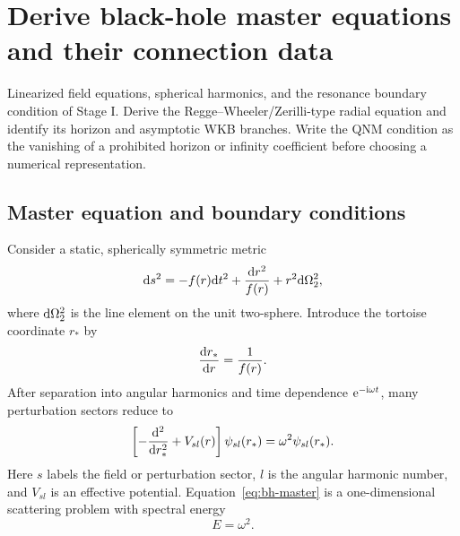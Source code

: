 \section{Derive black-hole master equations and their connection data}
\label{sec:black-hole-qnm}

\calculationroute
  {Linearized field equations, spherical harmonics, and the resonance boundary
  condition of Stage I.}
  {Derive the Regge--Wheeler/Zerilli-type radial equation and identify its
  horizon and asymptotic WKB branches.}
  {Write the QNM condition as the vanishing of a prohibited horizon or
  infinity coefficient before choosing a numerical representation.}

\subsection{Master equation and boundary conditions}
\label{subsec:bh-master}

Consider a static, spherically symmetric metric
\begin{equation}
  \mathrm{d} s^2
  =-f(r)\mathrm{d} t^2+\frac{\mathrm{d} r^2}{f(r)}
  +r^2\mathrm{d}\Omega_2^2 ,
  \label{eq:static-spherical-metric}
\end{equation}
where $\mathrm{d}\Omega_2^2$ is the line element on the unit two-sphere.  Introduce
the tortoise coordinate $r_*$ by
\begin{equation}
  \frac{\mathrm{d} r_*}{\mathrm{d} r}=\frac{1}{f(r)} .
  \label{eq:tortoise-definition}
\end{equation}
After separation into angular harmonics and time dependence
$\mathrm{e}^{-\mathrm{i}\omega t}$, many perturbation sectors reduce to
\begin{equation}
  \left[-\frac{\mathrm{d}^2}{\mathrm{d} r_*^2}
  +V_{sl}(r)\right]\psi_{sl}(r_*)
  =\omega^2\psi_{sl}(r_*) .
  \label{eq:bh-master}
\end{equation}
Here $s$ labels the field or perturbation sector, $l$ is the angular harmonic
number, and $V_{sl}$ is an effective potential.  Equation~\eqref{eq:bh-master}
is a one-dimensional scattering problem with spectral energy
\begin{equation}
  E=\omega^2 .
  \label{eq:bh-energy}
\end{equation}

